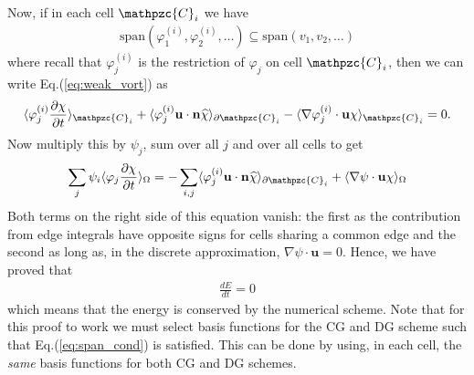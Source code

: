 \documentclass[11pt, reqno]{amsart}
\newcommand{\eqr}[1]{Eq.\thinspace(#1)}
\newcommand{\pfrac}[2]{\frac{\partial #1}{\partial #2}}
\newcommand{\mvec}[1]{\mathbf{#1}}
\newcommand{\script}[1]{\mathpzc{#1}}
\newcommand{\iprod}[2]{\langle{#1}\rangle_{#2}}
\theoremstyle{definition}
\begin{document}
Now, if in each cell $\script{C}_i$ we have
\begin{align}
  \textrm{span}(\varphi_1^{(i)},\varphi_2^{(i)},\ldots)
  \subseteq
  \textrm{span}(v_1,v_2,\ldots) \label{eq:span_cond}
\end{align}
where recall that $\varphi_j^{(i)}$ is the restriction of $\varphi_j$
on cell $\script{C}_i$, then we can write \eqr{\ref{eq:weak_vort}}
as
\begin{align}
  \iprod{\varphi_j^{(i)}\pfrac{\chi}{t}}{\script{C}_i} 
  +
  \iprod{\varphi_j^{(i)}\mvec{u}\cdot\mvec{n} \widehat{\chi}}{\partial \script{C}_i}
  -
  \iprod{\nabla \varphi_j^{(i)}\cdot \mvec{u}\chi}{\script{C}_i}
  = 0.
\end{align}
Now multiply this by $\psi_j$, sum over all $j$ and over all cells to
get
\begin{align}
  \sum_j \psi_i \iprod{\varphi_j \pfrac{\chi}{t}}{\Omega}
  =
  - 
  \sum_{i,j} \iprod{\varphi_j^{(i)}\mvec{u}\cdot\mvec{n} \widehat{\chi}}{\partial \script{C}_i}
  +
  \iprod{\nabla \psi \cdot \mvec{u}\chi}{\Omega}
\end{align}
Both terms on the right side of this equation vanish: the first as the
contribution from edge integrals have opposite signs for cells
sharing a common edge and the second as long as, in the discrete
approximation, $\nabla \psi \cdot \mvec{u} = 0$. Hence, we have proved
that
\begin{align}
  \frac{dE}{dt} = 0
\end{align}
which means that the energy is conserved by the numerical scheme. Note
that for this proof to work we must select basis functions for the CG
and DG scheme such that \eqr{\ref{eq:span_cond}} is satisfied. This
can be done by using, in each cell, the \emph{same} basis functions
for both CG and DG schemes.
\end{document}
